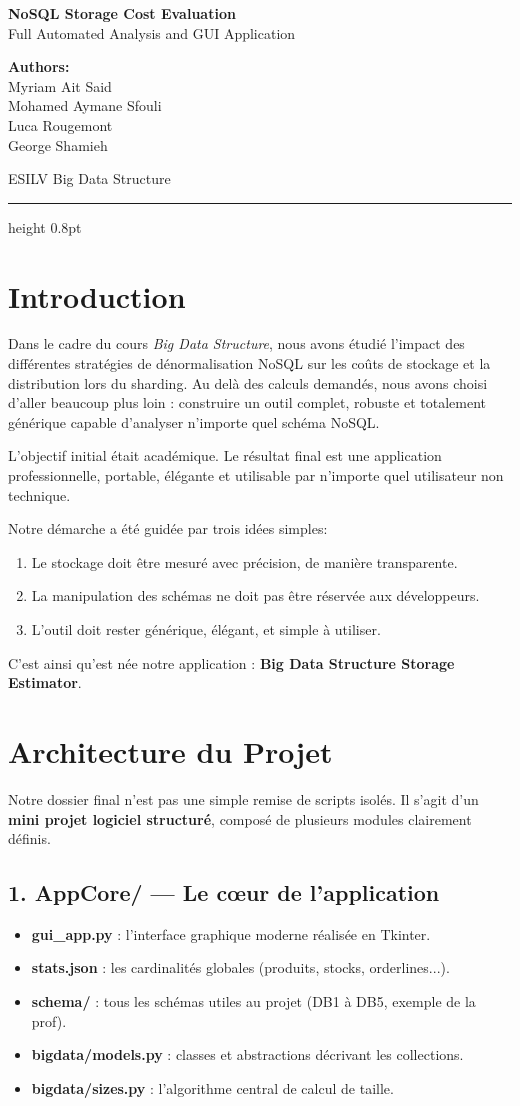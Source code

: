 \documentclass[12pt,a4paper]{article}
\renewcommand{\maketitle}{
    \begin{center}
        \vspace*{   1cm}
        \colorbox{mainblue!15}{
            \parbox{\textwidth}{
                \centering
                {\huge\bfseries\color{mainblue} NoSQL Storage Cost Evaluation}\\[0.3cm]
                {\Large\color{darkgray} Full Automated Analysis and GUI Application}
            }
        }
        \vspace{1cm}

        {\large
        \textbf{Authors:}\\
        Myriam Ait Said \\
        Mohamed Aymane Sfouli \\
        Luca Rougemont \\
        George Shamieh
        
        }

        \vspace{0.7cm}
        {\normalsize ESILV        Big Data Structure}
        \vspace{1cm}

        \hrule height 0.8pt \vspace{0.4cm}
    \end{center}
}
\begin{document}
\maketitle

\section*{Introduction}

Dans le cadre du cours \emph{Big Data Structure}, nous avons étudié l’impact des différentes stratégies de dénormalisation NoSQL sur les coûts de stockage et la distribution lors du sharding.  
Au   delà des calculs demandés, nous avons choisi d'aller beaucoup plus loin : construire un outil complet, robuste et totalement générique capable d’analyser n’importe quel schéma NoSQL.

L’objectif initial était académique.  
Le résultat final est une application professionnelle, portable, élégante et utilisable par n’importe quel utilisateur non technique.

\bigskip


Notre démarche a été guidée par trois idées simples:
\begin{enumerate}
    \item Le stockage doit être mesuré avec précision, de manière transparente.
    \item La manipulation des schémas ne doit pas être réservée aux développeurs.
    \item L’outil doit rester générique, élégant, et simple à utiliser.
\end{enumerate}

C’est ainsi qu’est née notre application : \textbf{Big Data Structure     Storage Estimator}.

\section{Architecture du Projet}

Notre dossier final n’est pas une simple remise de scripts isolés.  
Il s’agit d’un \textbf{mini   projet logiciel structuré}, composé de plusieurs modules clairement définis.

\subsection*{1. AppCore/ — Le cœur de l’application}

\begin{itemize}
    \item \textbf{gui\_app.py} : l’interface graphique moderne réalisée en Tkinter.
    \item \textbf{stats.json} : les cardinalités globales (produits, stocks, orderlines...).
    \item \textbf{schema/} : tous les schémas utiles au projet (DB1 à DB5, exemple de la prof).
    \item \textbf{bigdata/models.py} : classes et abstractions décrivant les collections.
    \item \textbf{bigdata/sizes.py} : l’algorithme central de calcul de taille.
\end{itemize}
\end{document}
